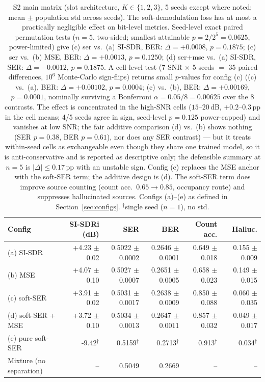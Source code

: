 \begin{table}[H]
\centering
\caption{S2 main matrix (slot architecture, $K\in\{1,2,3\}$, 5 seeds except where noted; mean $\pm$ population std across seeds). The soft-demodulation loss has at most a practically negligible effect on bit-level metrics. Seed-level exact paired permutation tests ($n{=}5$, two-sided; smallest attainable $p{=}2/2^5{=}0.0625$, power-limited) give (c) ser vs.\ (a) SI-SDR, BER: $\Delta{=}+0.0008$, $p{=}0.1875$; (c) ser vs.\ (b) MSE, BER: $\Delta{=}+0.0013$, $p{=}0.1250$; (d) ser+mse vs.\ (a) SI-SDR, SER: $\Delta{=}-0.0012$, $p{=}0.1875$. A cell-level test (7 SNR $\times$ 5 seeds $=$ 35 paired differences, $10^6$ Monte-Carlo sign-flips) returns small $p$-values for config (c) ((c) vs.\ (a), BER: $\Delta{=}+0.00102$, $p{=}0.0004$; (c) vs.\ (b), BER: $\Delta{=}+0.00169$, $p{=}0.0001$, nominally surviving a Bonferroni $\alpha{=}0.05/8{=}0.00625$ over the 8 contrasts. The effect is concentrated in the high-SNR cells ($15$--$20$\,dB, $+0.2$--$0.3$\,pp in the cell means; 4/5 seeds agree in sign, seed-level $p{=}0.125$ power-capped) and vanishes at low SNR; the fair additive comparison (d) vs.\ (b) shows nothing (SER $p{=}0.38$, BER $p{=}0.61$), nor does any SER contrast) --- but it treats within-seed cells as exchangeable even though they share one trained model, so it is anti-conservative and is reported as descriptive only; the defensible summary at $n{=}5$ is $|\Delta| \le 0.17$\,pp with an unstable sign. Config (c) replaces the MSE anchor with the soft-SER term; the additive design is (d). The soft-SER term does improve source counting (count acc.\ $0.65\!\rightarrow\!0.85$, occupancy route) and suppresses hallucinated sources. Configs (a)--(e) as defined in Section~\ref{sec:configs}. $^{\dagger}$single seed ($n{=}1$), no std.}
\label{tab:s2_main}
\setlength{\tabcolsep}{2pt}
\scriptsize
\begin{tabular}{l r r r r r}
\toprule
Config & SI-SDRi (dB) & SER & BER & Count acc. & Halluc. \\
\midrule
(a) SI-SDR & +4.23 $\pm$ 0.02 & 0.5022 $\pm$ 0.0002 & 0.2646 $\pm$ 0.0001 & 0.649 $\pm$ 0.018 & 0.155 $\pm$ 0.009 \\
(b) MSE & +4.07 $\pm$ 0.10 & 0.5027 $\pm$ 0.0007 & 0.2651 $\pm$ 0.0005 & 0.658 $\pm$ 0.023 & 0.149 $\pm$ 0.015 \\
(c) soft-SER & +3.91 $\pm$ 0.02 & 0.5031 $\pm$ 0.0017 & 0.2638 $\pm$ 0.0009 & 0.850 $\pm$ 0.088 & 0.060 $\pm$ 0.035 \\
(d) soft-SER + MSE & +3.72 $\pm$ 0.10 & 0.5034 $\pm$ 0.0013 & 0.2647 $\pm$ 0.0011 & 0.857 $\pm$ 0.032 & 0.049 $\pm$ 0.017 \\
(e) pure soft-SER & -9.42$^{\dagger}$ & 0.5159$^{\dagger}$ & 0.2713$^{\dagger}$ & 0.913$^{\dagger}$ & 0.034$^{\dagger}$ \\
Mixture (no separation) & -- & 0.5049 & 0.2669 & -- & -- \\
\bottomrule
\end{tabular}
\end{table}
